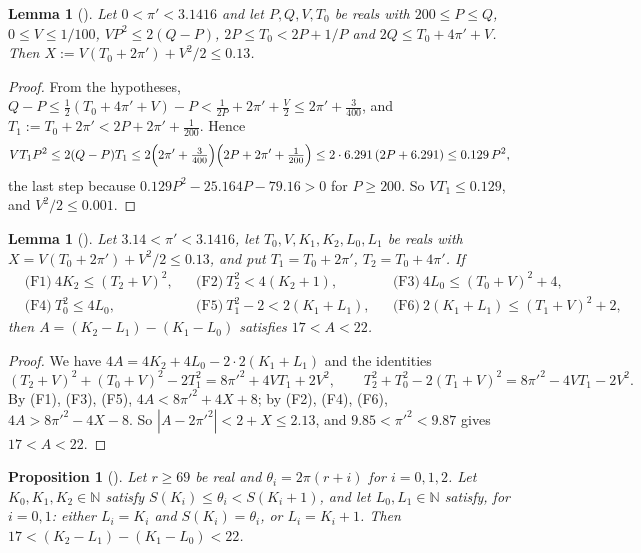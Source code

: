 \documentclass[11pt]{amsart}
\theoremstyle{plain}
\newtheorem{lemma}[theorem]{Lemma}
\newtheorem{proposition}[theorem]{Proposition}
\theoremstyle{definition}
\newcommand{\N}{\mathbb{N}}
\begin{document}
\begin{lemma}[]\label{lem:X}
Let $0<\pi'<3.1416$ and let $P,Q,V,T_0$ be reals with $200\le P\le Q$, $0\le V\le1/100$, $VP^2\le2(Q-P)$, $2P\le T_0<2P+1/P$ and $2Q\le T_0+4\pi'+V$. Then $X:=V(T_0+2\pi')+V^2/2\le0.13$.
\end{lemma}

\begin{proof}
From the hypotheses, $Q-P\le\frac12(T_0+4\pi'+V)-P<\frac1{2P}+2\pi'+\frac V2\le2\pi'+\frac3{400}$, and $T_1:=T_0+2\pi'<2P+2\pi'+\frac1{200}$. Hence
\[
  VT_1P^2\le2(Q-P)T_1\le2\Bigl(2\pi'+\tfrac3{400}\Bigr)\Bigl(2P+2\pi'+\tfrac1{200}\Bigr)\le2\cdot6.291\,(2P+6.291)\le0.129\,P^2,
\]
the last step because $0.129P^2-25.164P-79.16>0$ for $P\ge200$. So $VT_1\le0.129$, and $V^2/2\le0.001$.
\end{proof}

\begin{lemma}[]\label{lem:final}
Let $3.14<\pi'<3.1416$, let $T_0,V,K_1,K_2,L_0,L_1$ be reals with $X=V(T_0+2\pi')+V^2/2\le0.13$, and put $T_1=T_0+2\pi'$, $T_2=T_0+4\pi'$. If
\begin{align*}
  &\text{(F1)}\ 4K_2\le(T_2+V)^2, &&\text{(F2)}\ T_2^2<4(K_2+1), &&\text{(F3)}\ 4L_0\le(T_0+V)^2+4,\\
  &\text{(F4)}\ T_0^2\le4L_0, &&\text{(F5)}\ T_1^2-2<2(K_1+L_1), &&\text{(F6)}\ 2(K_1+L_1)\le(T_1+V)^2+2,
\end{align*}
then $A=(K_2-L_1)-(K_1-L_0)$ satisfies $17<A<22$.
\end{lemma}

\begin{proof}
We have $4A=4K_2+4L_0-2\cdot2(K_1+L_1)$ and the identities
\[
  (T_2+V)^2+(T_0+V)^2-2T_1^2=8\pi'^2+4VT_1+2V^2,\qquad T_2^2+T_0^2-2(T_1+V)^2=8\pi'^2-4VT_1-2V^2 .
\]
By (F1), (F3), (F5), $4A<8\pi'^2+4X+8$; by (F2), (F4), (F6), $4A>8\pi'^2-4X-8$. So $|A-2\pi'^2|<2+X\le2.13$, and $9.85<\pi'^2<9.87$ gives $17<A<22$.
\end{proof}

\begin{proposition}[]\label{prop:core}
Let $r\ge69$ be real and $\theta_i=2\pi(r+i)$ for $i=0,1,2$. Let $K_0,K_1,K_2\in\N$ satisfy $S(K_i)\le\theta_i<S(K_i+1)$, and let $L_0,L_1\in\N$ satisfy, for $i=0,1$: either $L_i=K_i$ and $S(K_i)=\theta_i$, or $L_i=K_i+1$. Then $17<(K_2-L_1)-(K_1-L_0)<22$.
\end{proposition}
\end{document}
